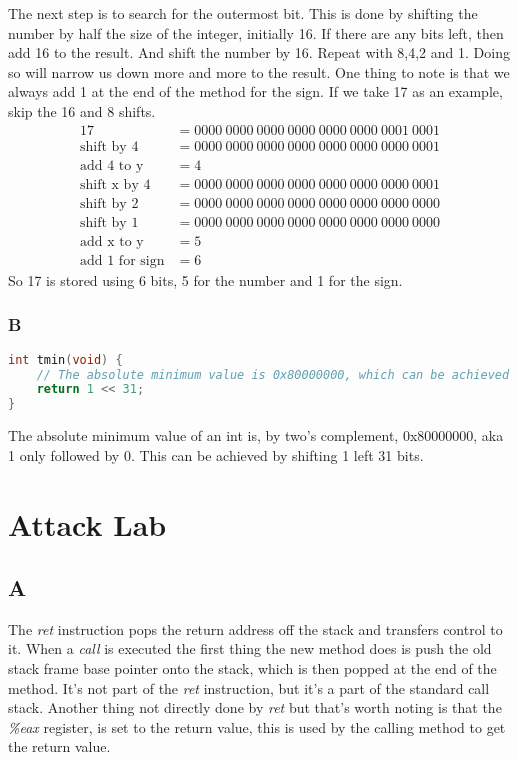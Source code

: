 \documentclass[11pt]{report}
\begin{document}
The next step is to search for the outermost bit. This is done by shifting the number by half the size of the integer, initially 16. If there are any bits left, then add 16 to the result. And shift the number by 16. Repeat with 8,4,2 and 1. Doing so will narrow us down more and more to the result. One thing to note is that we always add 1 at the end of the method for the sign. If we take 17 as an example, skip the 16 and 8 shifts. 
\begin{align*}
    17 &= 0000\ 0000\ 0000\ 0000\ 0000\ 0000\ 0001\ 0001\\
    \text{shift by 4} &= 0000\ 0000\ 0000\ 0000\ 0000\ 0000\ 0000\ 0001\\
    \text{add 4 to y} &= 4\\
    \text{shift x by 4} &= 0000\ 0000\ 0000\ 0000\ 0000\ 0000\ 0000\ 0001\\
    \text{shift by 2} &= 0000\ 0000\ 0000\ 0000\ 0000\ 0000\ 0000\ 0000\\
    \text{shift by 1} &= 0000\ 0000\ 0000\ 0000\ 0000\ 0000\ 0000\ 0000\\
    \text{add x to y} &= 5\\
    \text{add 1 for sign} &= 6
\end{align*}
So 17 is stored using 6 bits, 5 for the number and 1 for the sign.

\subsection{B}
\begin{lstlisting}[language=C]
int tmin(void) {
    // The absolute minimum value is 0x80000000, which can be achieved by shifting 1 left 31 bits.
    return 1 << 31;
}
\end{lstlisting}

The absolute minimum value of an int is, by two's complement, 0x80000000, aka 1 only followed by 0. This can be achieved by shifting 1 left 31 bits.


\chapter{Attack Lab}
\section{A}
The \textit{ret} instruction pops the return address off the stack and transfers control to it. When a \textit{call} is executed the first thing the new method does is push the old stack frame base pointer onto the stack, which is then popped at the end of the method. It's not part of the \textit{ret} instruction, but it's a part of the standard call stack. Another thing not directly done by \textit{ret} but that's worth noting is that the \textit{\%eax} register, is set to the return value, this is used by the calling method to get the return value.
\end{document}
